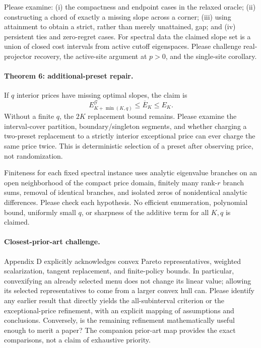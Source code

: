 \documentclass[11pt]{article}
\begin{document}
Please examine: (i) the compactness and endpoint cases in the relaxed
oracle; (ii) constructing a chord of exactly a missing slope across a
corner; (iii) using attainment to obtain a strict, rather than merely
unattained, gap; and (iv) persistent ties and zero-regret cases.
For spectral data the claimed slope set is a union of closed cost intervals
from active cutoff eigenspaces. Please challenge real-projector recovery,
the active-site argument at $p>0$, and the single-site corollary.

\paragraph{Theorem 6: additional-preset repair.}
If $q$ interior prices have missing optimal slopes, the claim is
\[
 E^{\mathcal G}_{K+\min(K,q)}\leq\overline E_K\leq E_K.
\]
Without a finite $q$, the $2K$ replacement bound remains. Please examine
the interval-cover partition, boundary/singleton segments, and whether
charging a two-preset replacement to a strictly interior exceptional price
can ever charge the same price twice. This is deterministic selection of
a preset after observing price, not randomization.

Finiteness for each fixed spectral instance uses analytic eigenvalue
branches on an open neighborhood of the compact price domain, finitely
many rank-$r$ branch sums, removal of identical branches, and isolated
zeros of nonidentical analytic differences. Please check each hypothesis.
No efficient enumeration, polynomial bound, uniformly small $q$, or
sharpness of the additive term for all $K,q$ is claimed.

\paragraph{Closest-prior-art challenge.}
Appendix D explicitly acknowledges convex Pareto representatives, weighted
scalarization, tangent replacement, and finite-policy bounds. In particular,
convexifying an already selected menu does not change its linear value;
allowing its selected representatives to come from a larger convex hull can.
Please identify any earlier result that directly yields the all-subinterval
criterion or the exceptional-price refinement, with an explicit mapping
of assumptions and conclusions. Conversely, is the remaining refinement
mathematically useful enough to merit a paper? The companion prior-art map
provides the exact comparisons, not a claim of exhaustive priority.
\end{document}
